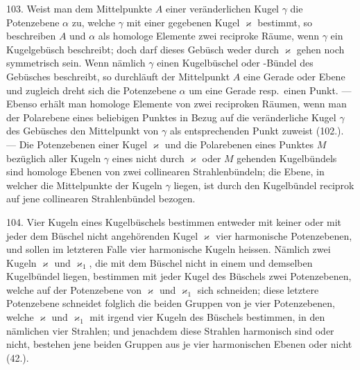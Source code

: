 103. Weist man dem Mittelpunkte $A$ einer ver\"anderlichen
Kugel $\gamma$ die Potenzebene $\alpha$ zu, welche $\gamma$ mit einer
gegebenen Kugel $\varkappa$ bestimmt, so beschreiben $A$ und $\alpha$ als
homologe Elemente zwei reciproke R\"aume, wenn $\gamma$ ein Kugelgeb\"usch
beschreibt; doch darf dieses Geb\"usch weder durch
$\varkappa$ gehen noch symmetrisch sein. Wenn n\"amlich $\gamma$ einen
Kugelb\"uschel oder -B\"undel des Geb\"usches beschreibt, so
durchl\"auft der Mittelpunkt $A$ eine Gerade oder Ebene und
zugleich dreht sich die Potenzebene $\alpha$ um eine Gerade resp.\ einen
Punkt. --- Ebenso erh\"alt man homologe Elemente von
zwei reciproken R\"aumen, wenn man der Polarebene eines
beliebigen Punktes in Bezug auf die ver\"anderliche Kugel $\gamma$
des Geb\"usches den Mittelpunkt von $\gamma$ als entsprechenden
Punkt zuweist (102.). --- Die Potenzebenen einer Kugel $\varkappa$
und die Polarebenen eines Punktes $M$ bez\"uglich aller Kugeln
$\gamma$ eines nicht durch $\varkappa$ oder $M$ gehenden Kugelb\"undels sind
homologe Ebenen von zwei collinearen Strahlenb\"undeln; die
Ebene, in welcher die Mittelpunkte der Kugeln $\gamma$ liegen, ist
durch den Kugelb\"undel reciprok auf jene collinearen Strahlenb\"undel
bezogen.

\begin{center}
\makebox[15em]{\hrulefill}
\end{center}


\label{p12}


\hspace{\parindent}%
104. Vier Kugeln eines Kugelb\"uschels bestimmen entweder
mit keiner oder mit jeder dem B\"uschel nicht angeh\"orenden
Kugel $\varkappa$ vier harmonische Potenzebenen, und sollen im
letzteren Falle {\glqq}vier harmonische Kugeln{\grqq} heissen. N\"amlich
zwei Kugeln $\varkappa$ und $\varkappa_1$, die mit dem B\"uschel nicht in einem
und demselben Kugelb\"undel liegen, bestimmen mit jeder
Kugel des B\"uschels zwei Potenzebenen, welche auf der Potenzebene
von $\varkappa$ und $\varkappa_1$ sich schneiden; diese letztere Potenzebene
schneidet folglich die beiden Gruppen von je vier Potenzebenen,
welche $\varkappa$ und $\varkappa_1$ mit irgend vier Kugeln des
B\"uschels bestimmen, in den n\"amlichen vier Strahlen; und
jenachdem diese Strahlen harmonisch sind oder nicht, bestehen
jene beiden Gruppen aus je vier harmonischen Ebenen
oder nicht (42.).

